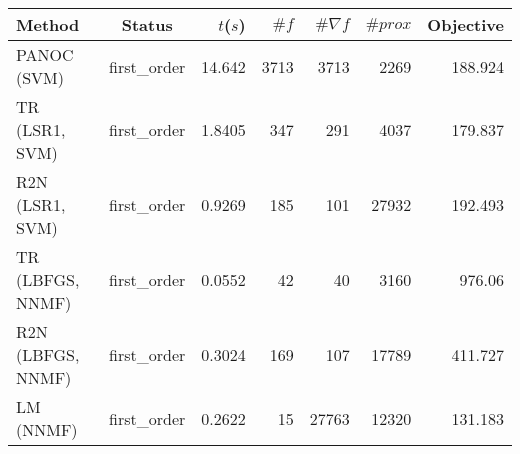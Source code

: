 \begin{tabular}{lcrrrrr}
  \hline
  \textbf{Method} & \textbf{Status} & \textbf{$t$($s$)} & \textbf{$\#f$} & \textbf{$\#\nabla f$} & \textbf{$\#prox$} & \textbf{Objective} \\\hline
  PANOC (SVM) & first\_order & 14.642 & 3713 & 3713 & 2269 & 188.924 \\
  TR (LSR1, SVM) & first\_order & 1.8405 & 347 & 291 & 4037 & 179.837 \\
  R2N (LSR1, SVM) & first\_order & 0.9269 & 185 & 101 & 27932 & 192.493 \\
  TR (LBFGS, NNMF) & first\_order & 0.0552 & 42 & 40 & 3160 & 976.06 \\
  R2N (LBFGS, NNMF) & first\_order & 0.3024 & 169 & 107 & 17789 & 411.727 \\
  LM (NNMF) & first\_order & 0.2622 & 15 & 27763 & 12320 & 131.183 \\\hline
\end{tabular}
